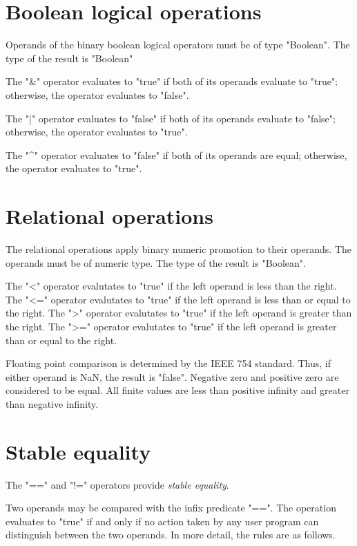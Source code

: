 \section{Boolean logical operations}

Operands of the binary boolean logical operators must be of type \xcd"Boolean".
The type of the result is \xcd"Boolean"

The \xcd"&" operator  evaluates to \xcd"true" if both of its
operands evaluate to \xcd"true"; otherwise, the operator
evaluates to \xcd"false".

The \xcd"|" operator  evaluates to \xcd"false" if both of its
operands evaluate to \xcd"false"; otherwise, the operator
evaluates to \xcd"true".

The \xcd"^" operator  evaluates to \xcd"false" if both of its
operands are equal; otherwise, the operator
evaluates to \xcd"true".

\section{Relational operations} 

The relational operations apply binary numeric promotion
to their operands. The operands must be of numeric type.
The type of the result is \xcd"Boolean".

The \xcd"<" operator evalutates to \xcd"true" if the left operand is
less than the right.
The \xcd"<=" operator evalutates to \xcd"true" if the left operand is
less than or equal to the right.
The \xcd">" operator evalutates to \xcd"true" if the left operand is
greater than the right.
The \xcd">=" operator evalutates to \xcd"true" if the left operand is
greater than or equal to the right.

Floating point comparison is determined by the IEEE 754
standard.  Thus,
if either operand is NaN, the result is \xcd"false".
Negative zero and positive zero are considered to be equal.
All finite values are less than positive infinity and greater
than negative infinity.

\section{Stable equality}\label{StableEquality}\index{==}\index{!=}

The \xcd"==" and \xcd"!=" operators provide \emph{stable equality}.

Two operands may be compared with the infix predicate \xcd"==".
The operation
evaluates to \xcd"true" if and only if no action taken by any
user program can distinguish between the two operands.  In more detail,
the rules are as follows.

